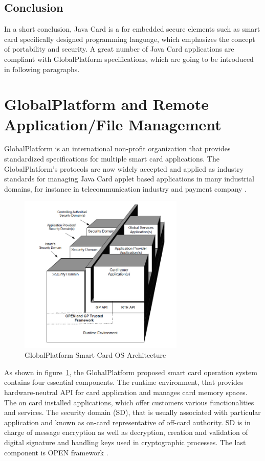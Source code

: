 \subsection{Conclusion}
In a short conclusion, Java Card is a for embedded secure elements such as smart card specifically designed programming language, which emphasizes the concept of portability and security. A great number of Java Card applications are compliant with GlobalPlatform specifications, which are going to be introduced in following paragraphs.

\section{GlobalPlatform and Remote Application/File Management}\label{secGP}
GlobalPlatform is an international non-profit organization that provides standardized specifications for multiple smart card applications. The  GlobalPlatform's protocols are now widely accepted and applied as industry standards for managing Java Card applet based applications in many industrial domains, for instance in telecommunication industry and payment company \cite{gp}. 
\begin{figure}[!htbp]
	\centering
	\includegraphics[width=0.7\textwidth]{gp_1.jpg}
		\caption{GlobalPlatform Smart Card OS Architecture \cite{gp}}
	\label{fig:gp_1}
\end{figure}


As shown in figure~\ref{fig:gp_1},  the GlobalPlatform proposed smart card operation system contains four essential components. The runtime environment, that provides hardware-neutral API for card application  and manages card memory spaces. The on card installed applications, which offer customers various functionalities and services. The security domain (SD), that is usually associated with particular application and known as on-card representative  of off-card  authority. SD is in charge of message encryption as well as decryption, creation and validation of digital signature and handling keys used in cryptographic processes. The last component is OPEN framework \cite{gp}.

